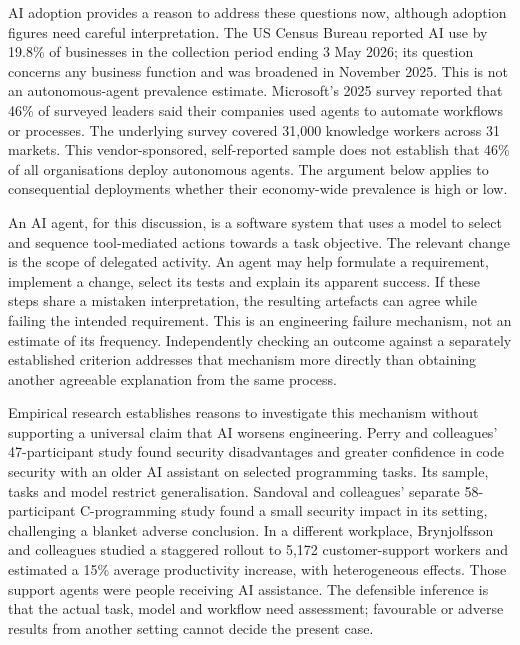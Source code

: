 \documentclass[11pt,a4paper]{article}
\begin{document}
AI adoption provides a reason to address these questions now, although adoption figures need careful interpretation. The US Census Bureau reported AI use by 19.8\% of businesses in the collection period ending 3 May 2026; its question concerns any business function and was broadened in November 2025. This is not an autonomous-agent prevalence estimate.\cite{census} Microsoft's 2025 survey reported that 46\% of surveyed leaders said their companies used agents to automate workflows or processes. The underlying survey covered 31,000 knowledge workers across 31 markets. This vendor-sponsored, self-reported sample does not establish that 46\% of all organisations deploy autonomous agents.\cite{microsoft} The argument below applies to consequential deployments whether their economy-wide prevalence is high or low.

An AI agent, for this discussion, is a software system that uses a model to select and sequence tool-mediated actions towards a task objective. The relevant change is the scope of delegated activity. An agent may help formulate a requirement, implement a change, select its tests and explain its apparent success. If these steps share a mistaken interpretation, the resulting artefacts can agree while failing the intended requirement. This is an engineering failure mechanism, not an estimate of its frequency. Independently checking an outcome against a separately established criterion addresses that mechanism more directly than obtaining another agreeable explanation from the same process.

Empirical research establishes reasons to investigate this mechanism without supporting a universal claim that AI worsens engineering. Perry and colleagues' 47-participant study found security disadvantages and greater confidence in code security with an older AI assistant on selected programming tasks. Its sample, tasks and model restrict generalisation.\cite{perry} Sandoval and colleagues' separate 58-participant C-programming study found a small security impact in its setting, challenging a blanket adverse conclusion.\cite{sandoval} In a different workplace, Brynjolfsson and colleagues studied a staggered rollout to 5,172 customer-support workers and estimated a 15\% average productivity increase, with heterogeneous effects. Those support agents were people receiving AI assistance.\cite{benefits} The defensible inference is that the actual task, model and workflow need assessment; favourable or adverse results from another setting cannot decide the present case.
\end{document}
